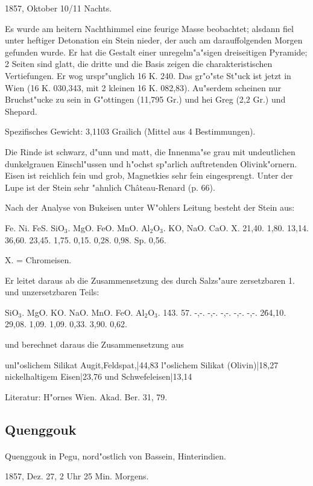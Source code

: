 \documentclass[a4paper, 11pt, oneside]{article}
\begin{document}
1857, Oktober 10/11 Nachts.

Es wurde am heitern Nachthimmel eine feurige Masse beobachtet; alsdann fiel unter heftiger Detonation ein Stein nieder, der auch am darauffolgenden Morgen gefunden wurde. Er hat die Gestalt einer unregelm"a"sigen dreiseitigen Pyramide; 2 Seiten sind glatt, die dritte und die Basis zeigen die charakteristischen Vertiefungen. Er wog urspr"unglich 16 K. 240. Das gr"o"ste St"uck ist jetzt in Wien (16 K. 030,343, mit 2 kleinen 16 K. 082,83). Au"serdem scheinen nur Bruchst"ucke zu sein in G"ottingen (11,795 Gr.) und hei Greg (2,2 Gr.) und Shepard.

Spezifisches Gewicht: 3,1103 Grailich (Mittel aus 4 Bestimmungen).

Die Rinde ist schwarz, d"unn und matt, die Innenma"se grau mit undeutlichen dunkelgrauen Einschl"ussen und h"ochst sp"arlich auftretenden Olivink"ornern. Eisen ist reichlich fein und grob, Magnetkies sehr fein eingesprengt. Unter der Lupe ist der Stein sehr "ahnlich Château-Renard (p. 66).

Nach der Analyse von Bukeisen unter W"ohlers Leitung besteht der Stein aus:

Fe. Ni. FeS. SiO$_{3}$. MgO. FeO. MnO. Al$_{2}$O$_{3}$. KO, NaO. CaO. X.  
21,40. 1,80. 13,14. 36,60. 23,45. 1,75. 0,15. 0,28. 0,98. Sp. 0,56.

X. = Chromeisen.

Er leitet daraus ab die Zusammensetzung des durch Salzs"aure zersetzbaren 1. und unzersetzbaren Teils:

SiO$_{3}$. MgO. KO. NaO. MnO. FeO. Al$_{2}$O$_{3}$.  
1\. 43. 57. -,-. -,-. -,-. -,-. -,-.  
2\. 64,10. 29,08. 1,09. 1,09. 0,33. 3,90. 0,62.

und berechnet daraus die Zusammensetzung aus

unl"oslichem Silikat {Augit,Feldspat,}|44,83  
l"oslichem Silikat (Olivin)|18,27  
nickelhaltigem Eisen|23,76  
und Schwefeleisen|13,14

Literatur: H"ornes Wien. Akad. Ber. 31, 79.

\subsection{Quenggouk}
\normalsize
\paragraph{}
Quenggouk in Pegu, nord"ostlich von Bassein, Hinterindien.

1857, Dez. 27, 2 Uhr 25 Min. Morgens.
\end{document}
